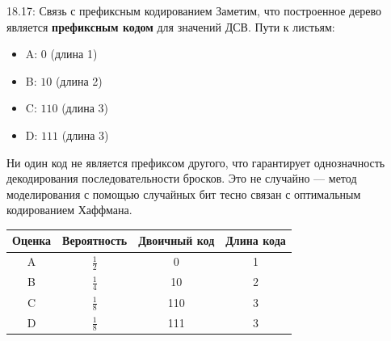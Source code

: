 \documentclass[a4paper,12pt]{article}
\begin{document}
	\begin{notebook}{18.17: Связь с префиксным кодированием}
		Заметим, что построенное дерево является \textbf{префиксным кодом} для значений ДСВ. Пути к листьям:
		\begin{itemize}
			\item A: \(0\) (длина 1)
			\item B: \(10\) (длина 2)
			\item C: \(110\) (длина 3)
			\item D: \(111\) (длина 3)
		\end{itemize}
		
		Ни один код не является префиксом другого, что гарантирует однозначность декодирования последовательности бросков. Это не случайно — метод моделирования с помощью случайных бит тесно связан с оптимальным кодированием Хаффмана.
	\end{notebook}
	
	\begin{center}
		\begin{tabular}{|c|c|c|c|}
			\hline
			\textbf{Оценка} & \textbf{Вероятность} & \textbf{Двоичный код} & \textbf{Длина кода} \\ \hline
			A & \(\frac{1}{2}\) & 0 & 1 \\
			B & \(\frac{1}{4}\) & 10 & 2 \\
			C & \(\frac{1}{8}\) & 110 & 3 \\
			D & \(\frac{1}{8}\) & 111 & 3 \\ \hline
		\end{tabular}
	\end{center}
	
\end{document}
